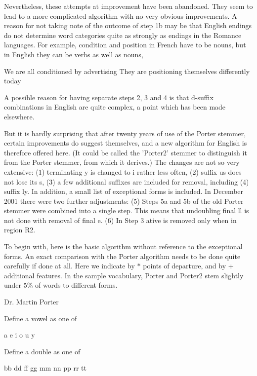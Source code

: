 Nevertheless, these attempts at improvement have been abandoned. They seem to lead to a more complicated algorithm with no very obvious improvements. A reason for not taking note of the outcome of step 1b may be that English endings do not determine word categories quite as strongly as endings in the Romance languages. For example, condition and position in French have to be nouns, but in English they can be verbs as well as nouns,

We are all conditioned by advertising They are positioning themselves differently today

A possible reason for having separate steps 2, 3 and 4 is that d-\/suffix combinations in English are quite complex, a point which has been made elsewhere.

But it is hardly surprising that after twenty years of use of the Porter stemmer, certain improvements do suggest themselves, and a new algorithm for English is therefore offered here. (It could be called the 'Porter2' stemmer to distinguish it from the Porter stemmer, from which it derives.) The changes are not so very extensive\-: (1) terminating y is changed to i rather less often, (2) suffix us does not lose its s, (3) a few additional suffixes are included for removal, including (4) suffix ly. In addition, a small list of exceptional forms is included. In December 2001 there were two further adjustments\-: (5) Steps 5a and 5b of the old Porter stemmer were combined into a single step. This means that undoubling final ll is not done with removal of final e. (6) In Step 3 ative is removed only when in region R2.

To begin with, here is the basic algorithm without reference to the exceptional forms. An exact comparison with the Porter algorithm needs to be done quite carefully if done at all. Here we indicate by $\ast$ points of departure, and by + additional features. In the sample vocabulary, Porter and Porter2 stem slightly under 5\% of words to different forms.

Dr. Martin Porter

Define a vowel as one of
\begin{DoxyItemize}
\item a e i o u y
\end{DoxyItemize}

Define a double as one of
\begin{DoxyItemize}
\item bb dd ff gg mm nn pp rr tt
\end{DoxyItemize}

